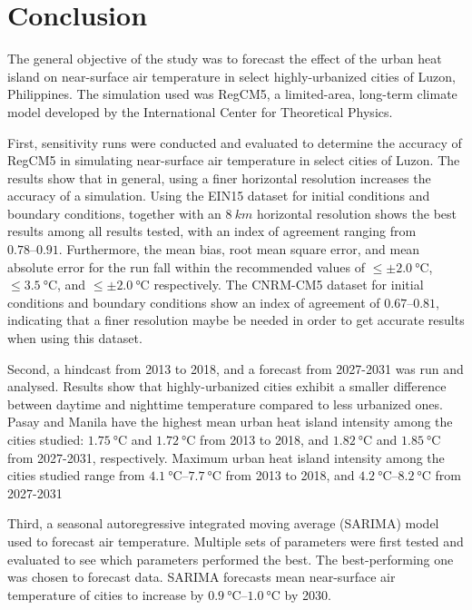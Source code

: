 \section{Conclusion}
	The general objective of the study was to forecast the effect of the urban heat island on near-surface air temperature in select highly-urbanized cities of Luzon, Philippines.
	The simulation used was RegCM5, a limited-area, long-term climate model developed by the International Center for Theoretical Physics.
	
	First, sensitivity runs were conducted and evaluated to determine the accuracy of RegCM5 in simulating near-surface air temperature in select cities of Luzon.
	The results show that in general, using a finer horizontal resolution increases the accuracy of a simulation.
	Using the EIN15 dataset for initial conditions and boundary conditions, together with an $\qty{8}{km}$ horizontal resolution shows the best results among all results tested, with an index of agreement ranging from $\numrange{0.78}{0.91}$.
	Furthermore, the mean bias, root mean square error, and mean absolute error for the run fall within the recommended values of $\leq \pm \qty{2.0}{\degreeCelsius}$, $\leq \qty{3.5}{\degreeCelsius}$, and $\leq \pm \qty{2.0}{\degreeCelsius}$ respectively.
	The CNRM-CM5 dataset for initial conditions and boundary conditions show an index of agreement of $\numrange{0.67}{0.81}$, indicating that a finer resolution maybe be needed in order to get accurate results when using this dataset.
	
	Second, a hindcast from 2013 to 2018, and a forecast from 2027-2031 was run and analysed.
	Results show that highly-urbanized cities exhibit a smaller difference between daytime and nighttime temperature compared to less urbanized ones.
	Pasay and Manila have the highest mean urban heat island intensity among the cities studied: 
		$\qty{1.75}{\degreeCelsius}$ and $\qty{1.72}{\degreeCelsius}$ from 2013 to 2018,
		and
		$\qty{1.82}{\degreeCelsius}$ and $\qty{1.85}{\degreeCelsius}$ from 2027-2031, respectively.
	Maximum urban heat island intensity among the cities studied range from  
		$\qtyrange{4.1}{7.7}{\degreeCelsius}$ from 2013 to 2018,
		and
		$\qtyrange{4.2}{8.2}{\degreeCelsius}$ from 2027-2031
	
	Third, a seasonal autoregressive integrated moving average (SARIMA) model used to forecast air temperature.
	Multiple sets of parameters were first tested and evaluated to see which parameters performed the best.
	The best-performing one was chosen to forecast data.
	SARIMA forecasts mean near-surface air temperature of cities to increase by $\qtyrange{0.9}{1.0}{\degreeCelsius}$ by 2030.

